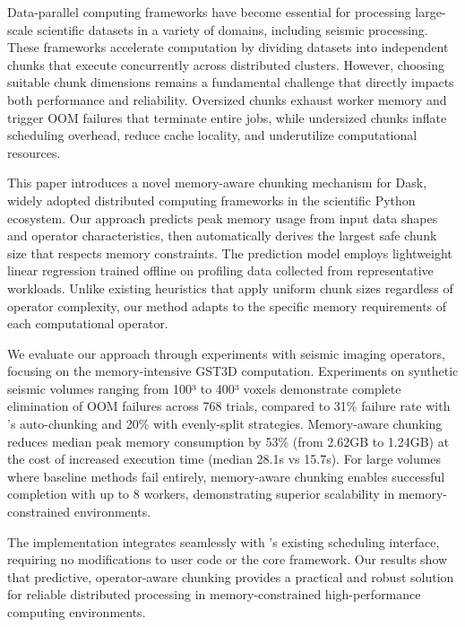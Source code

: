Data-parallel computing frameworks have become essential for processing large-scale scientific datasets in a variety of domains, including seismic processing.
These frameworks accelerate computation by dividing datasets into independent chunks that execute concurrently across distributed clusters.
However, choosing suitable chunk dimensions remains a fundamental challenge that directly impacts both performance and reliability.
Oversized chunks exhaust worker memory and trigger \ac{OOM} failures that terminate entire jobs, while undersized chunks inflate scheduling overhead, reduce cache locality, and underutilize computational resources.

This paper introduces a novel memory-aware chunking mechanism for Dask,  widely adopted distributed computing frameworks in the scientific Python ecosystem.
Our approach predicts peak memory usage from input data shapes and operator characteristics, then automatically derives the largest safe chunk size that respects memory constraints.
The prediction model employs lightweight linear regression trained offline on profiling data collected from representative workloads.
Unlike existing heuristics that apply uniform chunk sizes regardless of operator complexity, our method adapts to the specific memory requirements of each computational operator.

We evaluate our approach through experiments with seismic imaging operators, focusing on the memory-intensive \ac{GST3D} computation.
Experiments on synthetic seismic volumes ranging from 100³ to 400³ voxels demonstrate complete elimination of OOM failures across 768 trials, compared to 31\% failure rate with \dask's auto-chunking and 20\% with evenly-split strategies.
Memory-aware chunking reduces median peak memory consumption by 53\% (from 2.62GB to 1.24GB) at the cost of increased execution time (median 28.1s vs 15.7s).
For large volumes where baseline methods fail entirely, memory-aware chunking enables successful completion with up to 8 workers, demonstrating superior scalability in memory-constrained environments.

The implementation integrates seamlessly with \dask's existing scheduling interface, requiring no modifications to user code or the core framework.
Our results show that predictive, operator-aware chunking provides a practical and robust solution for reliable distributed processing in memory-constrained high-performance computing environments.

